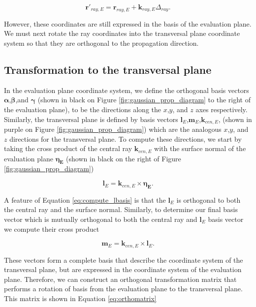 \begin{equation}
    \mathbf{r}'_{ray,E} = \mathbf{r}_{ray,E} + \mathbf{k}_{ray,E}\Delta_{ray}.
    \label{eq:prop_ray}
\end{equation}

However, these coordinates are still expressed in the basis of the evaluation plane. We must next rotate the ray coordinates into the transversal plane coordinate system so that they are orthogonal to the propagation direction.

\subsection{Transformation to the transversal plane}
In the evaluation plane coordinate system, we define the orthogonal basis vectors $\boldsymbol{{\alpha}}$,$\boldsymbol{{\beta}}$,and $\boldsymbol{{\gamma}}$ (shown in black on Figure \ref{fig:gaussian_prop_diagram} to the right of the evaluation plane), to be the directions along the $x$,$y$, and $z$ axes respectively. Similarly, the transversal plane is defined by basis vectors $\mathbf{l}_{E}$,$\mathbf{m}_{E}$,$\mathbf{k}_{cen,E}$, (shown in purple on Figure \ref{fig:gaussian_prop_diagram}) which are the analogous $x$,$y$, and $z$ directions for the transversal plane. To compute these directions, we start by taking the cross product of the central ray $\mathbf{k}_{cen,E}$ with the surface normal of the evaluation plane $\boldsymbol{\eta_{E}}$ (shown in black on the right of Figure \ref{fig:gaussian_prop_diagram})

\begin{equation}
    \mathbf{l}_{E} = \mathbf{k}_{cen,E} \times \mathbf{\eta_{E}}.
    \label{eq:compute_lbasis}
\end{equation}

A feature of Equation \ref{eq:compute_lbasis} is that the $\mathbf{l}_{E}$ is orthogonal to both the central ray and the surface normal. Similarly, to determine our final basis vector which is mutually orthogonal to both the central ray and $\mathbf{l}_{E}$ basis vector we compute their cross product

\begin{equation}
    \mathbf{m}_{E} = \mathbf{k}_{cen,E} \times \mathbf{l}_{E}.
    \label{eq:compute_mbasis}
\end{equation}

These vectors form a complete basis that describe the coordinate system of the transversal plane, but are expressed in the coordinate system of the evaluation plane. Therefore, we can construct an orthogonal transformation matrix that performs a rotation of basis from the evaluation plane to the transversal plane. This matrix is shown in Equation \ref{eq:orthomatrix}


